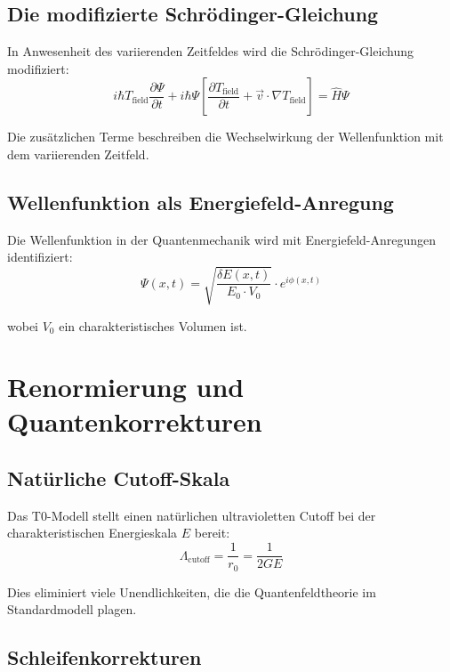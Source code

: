 \documentclass[12pt,a4paper]{report}
\begin{document}
	\subsection{Die modifizierte Schrödinger-Gleichung}
	
	In Anwesenheit des variierenden Zeitfeldes wird die Schrödinger-Gleichung modifiziert:
	\begin{equation}
		\boxed{i\hbar T_{\text{field}} \frac{\partial\Psi}{\partial t} + i\hbar\Psi\left[\frac{\partial T_{\text{field}}}{\partial t} + \vec{v} \cdot \nabla T_{\text{field}}\right] = \hat{H}\Psi}
		\label{eq:modified_schrodinger}
	\end{equation}
	
	Die zusätzlichen Terme beschreiben die Wechselwirkung der Wellenfunktion mit dem variierenden Zeitfeld.
	
	\subsection{Wellenfunktion als Energiefeld-Anregung}
	
	Die Wellenfunktion in der Quantenmechanik wird mit Energiefeld-Anregungen identifiziert:
	\begin{equation}
		\Psi(x,t) = \sqrt{\frac{\delta E(x,t)}{E_0 \cdot V_0}} \cdot e^{i\phi(x,t)}
	\end{equation}
	
	wobei $V_0$ ein charakteristisches Volumen ist.
	
	\section{Renormierung und Quantenkorrekturen}
	
	\subsection{Natürliche Cutoff-Skala}
	
	Das T0-Modell stellt einen natürlichen ultravioletten Cutoff bei der charakteristischen Energieskala $E$ bereit:
	\begin{equation}
		\Lambda_{\text{cutoff}} = \frac{1}{r_0} = \frac{1}{2GE}
	\end{equation}
	
	Dies eliminiert viele Unendlichkeiten, die die Quantenfeldtheorie im Standardmodell plagen.
	
	\subsection{Schleifenkorrekturen}
	
\end{document}
